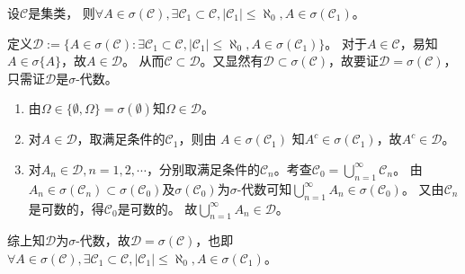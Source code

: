 \documentclass{ctexart}
\begin{document}
\begin{problem}\label{pro:1.4.2}
  设\(\mathcal{C} \)是集类，
  则\(\forall A \in \sigma(\mathcal{C}),\exists \mathcal{C}_1 \subset \mathcal{C},|\mathcal{C}_1| \leq \aleph_0,A \in \sigma(\mathcal{C}_1) \)。
\end{problem}
\begin{solution}
  定义\(\mathcal{D}:=\{ A \in \sigma(\mathcal{C}):\exists \mathcal{C}_1 \subset \mathcal{C},|\mathcal{C}_1| \leq \aleph_0,A \in \sigma(\mathcal{C}_1) \} \)。
  对于\(A \in \mathcal{C} \)，易知\(A \in \sigma\{A\} \)，故\(A \in \mathcal{D} \)。
  从而\(\mathcal{C} \subset \mathcal{D} \)。又显然有\(\mathcal{D} \subset \sigma(\mathcal{C}) \)，故要证\(\mathcal{D} =\sigma(\mathcal{C})\)，只需证\(\mathcal{D} \)是\(\sigma \)-代数。

  \begin{enumerate}
    \item 由\(\Omega \in \{\emptyset,\Omega\} = \sigma(\emptyset) \)知\(\Omega \in \mathcal{D} \)。
    \item 对\(A \in \mathcal{D} \)，取满足条件的\(\mathcal{C}_1 \)，则由 \(A \in \sigma(\mathcal{C}_1) \) 知\(A^c \in \sigma(\mathcal{C}_1) \)，故\(A^c \in \mathcal{D} \)。
    \item 对\(A_n \in \mathcal{D},n=1,2,\cdots \)，分别取满足条件的\(\mathcal{C}_n \)。考查\(\mathcal{C}_0=\bigcup_{n=1}^{\infty} \mathcal{C}_n \)。
      由\(A_n \in \sigma(\mathcal{C}_n) \subset \sigma(\mathcal{C}_0) \)及\(\sigma(\mathcal{C}_0) \)为\(\sigma \)-代数可知\(\bigcup_{n=1}^{\infty} A_n \in \sigma(\mathcal{C}_0) \)。
      又由\(\mathcal{C}_n \)是可数的，得\(\mathcal{C}_0 \)是可数的。
      故\(\bigcup_{n=1}^{\infty} A_n \in \mathcal{D} \)。
  \end{enumerate}
  综上知\(\mathcal{D} \)为\(\sigma \)-代数，故\(\mathcal{D}=\sigma(\mathcal{C}) \)，也即\(\forall A \in \sigma(\mathcal{C}),\exists \mathcal{C}_1 \subset \mathcal{C},|\mathcal{C}_1| \leq \aleph_0,A \in \sigma(\mathcal{C}_1) \)。
\end{solution}
\end{document}
